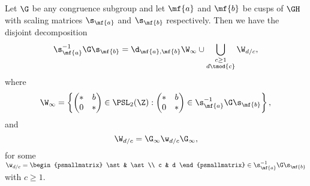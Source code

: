       \begin{theorem}
        Let $\G$ be any congruence subgroup and let $\mf{a}$ and $\mf{b}$ be cusps of $\GH$ with scaling matrices $\s_{\mf{a}}$ and $\s_{\mf{b}}$ respectively. Then we have the disjoint decomposition
        \[
          \s_{\mf{a}}^{-1}\G\s_{\mf{b}} = \d_{\mf{a},\mf{b}}\W_{\infty}\cup\bigcup_{\substack{c \ge 1 \\ d \tmod{c}}}\W_{d/c},
        \]
        where
        \[
          \W_{\infty} = \left\{\begin{pmatrix} \ast & b \\ 0 & \ast \end{pmatrix} \in \PSL_{2}(\Z):\begin{pmatrix} \ast & b \\ 0 & \ast \end{pmatrix} \in \s_{\mf{a}}^{-1}\G\s_{\mf{b}}\right\},
        \]
        and
        \[
          \W_{d/c} = \G_{\infty}\w_{d/c}\G_{\infty},
        \]
        for some $\w_{d/c} = \begin{psmallmatrix} \ast & \ast \\ c & d \end{psmallmatrix} \in \s_{\mf{a}}^{-1}\G\s_{\mf{b}}$ with $c \ge 1$.
      \end{theorem}
